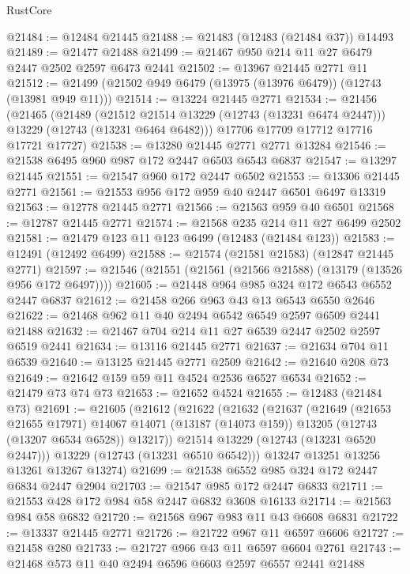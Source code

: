 \begin{lexlean}{RustCore}
\begin{coremodule}
@21484 := @12484 @21445
@21488 := @21483 (@12483 (@21484 @37)) @14493
@21489 := @21477 @21488
@21499 := @21467 @950 @214 @11 @27 @6479 @2447 @2502 @2597 @6473 @2441
@21502 := @13967 @21445 @2771 @11
@21512 := @21499 (@21502 @949 @6479 (@13975 (@13976 @6479)) (@12743 (@13981 @949 @11)))
@21514 := @13224 @21445 @2771
@21534 := @21456
    (@21465
      (@21489
        (@21512 @21514 @13229 (@12743 (@13231 @6474 @2447)))
        @13229
        (@12743 (@13231 @6464 @6482)))
      @17706
      @17709
      @17712
      @17716
      @17721
      @17727)
@21538 := @13280 @21445 @2771 @2771 @13284
@21546 := @21538 @6495 @960 @987 @172 @2447 @6503 @6543 @6837
@21547 := @13297 @21445
@21551 := @21547 @960 @172 @2447 @6502
@21553 := @13306 @21445 @2771
@21561 := @21553 @956 @172 @959 @40 @2447 @6501 @6497 @13319
@21563 := @12778 @21445 @2771
@21566 := @21563 @959 @40 @6501
@21568 := @12787 @21445 @2771
@21574 := @21568 @235 @214 @11 @27 @6499 @2502
@21581 := @21479 @123 @11 @123 @6499 (@12483 (@21484 @123))
@21583 := @12491 (@12492 @6499)
@21588 := @21574 (@21581 @21583) (@12847 @21445 @2771)
@21597 := @21546 (@21551 (@21561 (@21566 @21588) (@13179 (@13526 @956 @172 @6497))))
@21605 := @21448 @964 @985 @324 @172 @6543 @6552 @2447 @6837
@21612 := @21458 @266 @963 @43 @13 @6543 @6550 @2646
@21622 := @21468 @962 @11 @40 @2494 @6542 @6549 @2597 @6509 @2441 @21488
@21632 := @21467 @704 @214 @11 @27 @6539 @2447 @2502 @2597 @6519 @2441
@21634 := @13116 @21445 @2771
@21637 := @21634 @704 @11 @6539
@21640 := @13125 @21445 @2771 @2509
@21642 := @21640 @208 @73
@21649 := @21642 @159 @59 @11 @4524 @2536 @6527 @6534
@21652 := @21479 @73 @74 @73
@21653 := @21652 @4524
@21655 := @12483 (@21484 @73)
@21691 := @21605
    (@21612
      (@21622
        (@21632
          (@21637
            (@21649
              (@21653 @21655 @17971)
              @14067
              @14071
              (@13187 (@14073 @159))
              @13205
              (@12743 (@13207 @6534 @6528))
              @13217))
          @21514
          @13229
          (@12743 (@13231 @6520 @2447)))
        @13229
        (@12743 (@13231 @6510 @6542)))
      @13247
      @13251
      @13256
      @13261
      @13267
      @13274)
@21699 := @21538 @6552 @985 @324 @172 @2447 @6834 @2447 @2904
@21703 := @21547 @985 @172 @2447 @6833
@21711 := @21553 @428 @172 @984 @58 @2447 @6832 @3608 @16133
@21714 := @21563 @984 @58 @6832
@21720 := @21568 @967 @983 @11 @43 @6608 @6831
@21722 := @13337 @21445 @2771
@21726 := @21722 @967 @11 @6597 @6606
@21727 := @21458 @280
@21733 := @21727 @966 @43 @11 @6597 @6604 @2761
@21743 := @21468 @573 @11 @40 @2494 @6596 @6603 @2597 @6557 @2441 @21488

\end{coremodule}
\end{lexlean}
